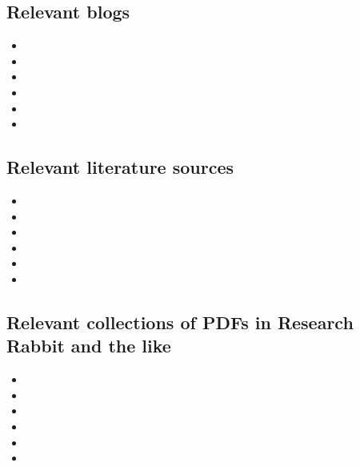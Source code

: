 \documentclass[11pt,letterpaper]{article}
\begin{document}
\subsection{Relevant blogs}
\label{sec:org0afef85}
\begin{itemize}
\item 

\item 

\item 

\item 

\item 

\item 
\end{itemize}


\subsection{Relevant literature sources}
\label{sec:org814ef6b}

\begin{itemize}
\item 

\item 

\item 

\item 

\item 

\item 
\end{itemize}

\subsection{Relevant collections of PDFs in Research Rabbit and the like}
\label{sec:org67e8fee}


\begin{itemize}
\item 

\item 

\item 

\item 

\item 

\item 
\end{itemize}
\end{document}
